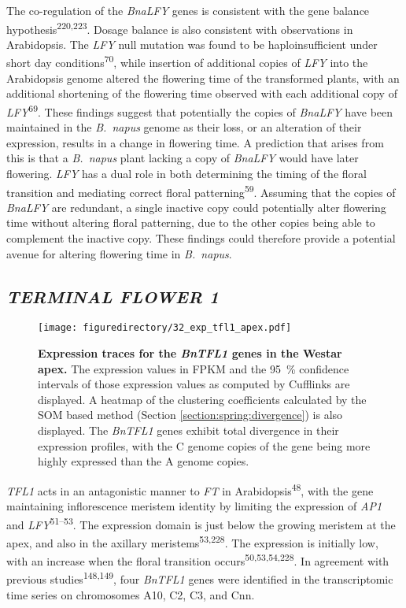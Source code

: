 \documentclass[12pt,]{book}
\begin{document}
The co-regulation of the \emph{BnaLFY} genes is consistent with the gene
balance hypothesis\textsuperscript{220,223}. Dosage balance is also
consistent with observations in Arabidopsis. The \emph{LFY} null
mutation was found to be haploinsufficient under short day
conditions\textsuperscript{70}, while insertion of additional copies of
\emph{LFY} into the Arabidopsis genome altered the flowering time of the
transformed plants, with an additional shortening of the flowering time
observed with each additional copy of \emph{LFY}\textsuperscript{69}.
These findings suggest that potentially the copies of \emph{BnaLFY} have
been maintained in the \emph{B.~napus} genome as their loss, or an
alteration of their expression, results in a change in flowering time. A
prediction that arises from this is that a \emph{B.~napus} plant lacking
a copy of \emph{BnaLFY} would have later flowering. \emph{LFY} has a
dual role in both determining the timing of the floral transition and
mediating correct floral patterning\textsuperscript{59}. Assuming that
the copies of \emph{BnaLFY} are redundant, a single inactive copy could
potentially alter flowering time without altering floral patterning, due
to the other copies being able to complement the inactive copy. These
findings could therefore provide a potential avenue for altering
flowering time in \emph{B.~napus}.

\subsection{\texorpdfstring{\emph{TERMINAL FLOWER
1}}{TERMINAL FLOWER 1}}\label{section:spring:tfl1}

\begin{figure}[htbp]
\centering
\texttt{[image: figuredirectory/32\_exp\_tfl1\_apex.pdf]}
\caption{\textbf{Expression traces for the \emph{BnTFL1} genes in the
Westar apex.} The expression values in FPKM and the 95~\% confidence
intervals of those expression values as computed by Cufflinks are
displayed. A heatmap of the clustering coefficients calculated by the
SOM based method (Section \ref{section:spring:divergence}) is also
displayed. The \emph{BnTFL1} genes exhibit total divergence in their
expression profiles, with the C genome copies of the gene being more
highly expressed than the A genome copies.}\label{figure:232:tfl1apex}
\end{figure}

\emph{TFL1} acts in an antagonistic manner to \emph{FT} in
Arabidopsis\textsuperscript{48}, with the gene maintaining inflorescence
meristem identity by limiting the expression of \emph{AP1} and
\emph{LFY}\textsuperscript{51--53}. The expression domain is just below
the growing meristem at the apex, and also in the axillary
meristems\textsuperscript{53,228}. The expression is initially low, with
an increase when the floral transition
occurs\textsuperscript{50,53,54,228}. In agreement with previous
studies\textsuperscript{148,149}, four \emph{BnTFL1} genes were
identified in the transcriptomic time series on chromosomes A10, C2, C3,
and Cnn.
\end{document}
